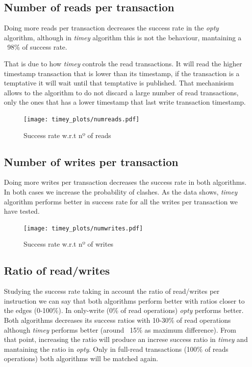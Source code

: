 \documentclass[a4paper, 10pt]{article}
\begin{document}
\clearpage
\subsection{Number of reads per transaction}

Doing more reads per transaction decreases the success rate in the \textit{opty} algorithm, although in \textit{timey} algorithm this is not the behaviour, mantaining a ~98\% of success rate.

That is due to how \textit{timey} controls the read transactions. It will read the higher timestamp transaction that is lower than its timestamp, if the transaction is a temptative it will wait until that temptative is published. That mechanisism allows to the algorithm to do not discard a large number of read transactions, only the ones that has a lower timestamp that last write transaction timestamp.

\begin{figure}[H]
  \centering
  \texttt{[image: timey\_plots/numreads.pdf]}
    \caption{Success rate w.r.t nº of reads}
    \label{timey:numreads}
\end{figure} 

\clearpage
\subsection{Number of writes per transaction}

Doing more writes per transaction decreases the success rate in both algorithms. In both cases we increase the probability of clashes. As the data shows, \textit{timey} algorithm performs better in success rate for all the writes per transaction we have tested.

\begin{figure}[H]
  \centering
  \texttt{[image: timey\_plots/numwrites.pdf]}
    \caption{Success rate w.r.t nº of writes}
    \label{timey:numwrites}
\end{figure} 

\clearpage
\subsection{Ratio of read/writes}

Studying the success rate taking in account the ratio of read/writes per instruction we can say that both algorithms perform better with ratios closer to the edges (0-100\%). In only-write (0\% of read operations) \textit{opty} performs better. Both algorithms decreases its success ratios with 10-30\% of read operations although \textit{timey} performs better (around ~15\% as maximum difference). From that point, increasing the ratio will produce an increse success ratio in \textit{timey} and mantaining the ratio in \textit{opty}. Only in full-read transactions (100\% of reads operations) both algorithms will be matched again.
\end{document}
